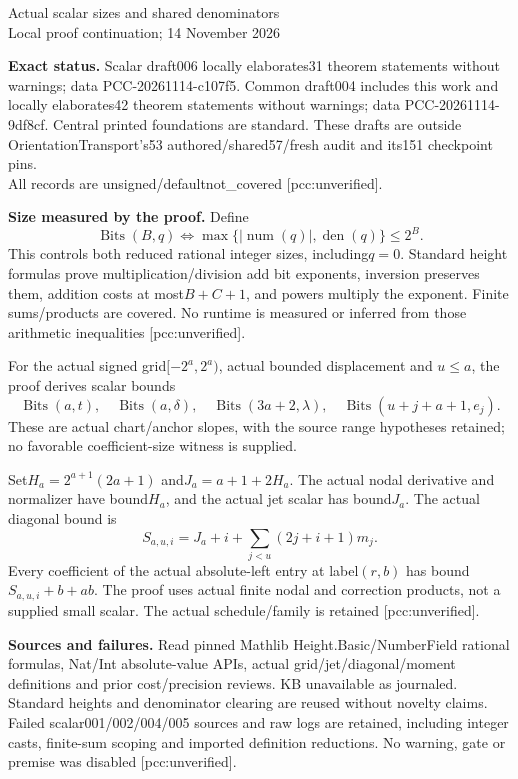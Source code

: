 \documentclass[10pt]{article}
\begin{document}
\begin{center}{\Large Actual scalar sizes and shared denominators}\\[5pt]
Local proof continuation; 14 November 2026
\end{center}
\textbf{Exact status.} Scalar draft006 locally elaborates31 theorem statements
without warnings; data PCC-20261114-c107f5. Common draft004 includes this
work and locally elaborates42 theorem statements without warnings; data
PCC-20261114-9df8cf. Central printed foundations are standard. These drafts
are outside OrientationTransport's53 authored/shared57/fresh audit and its151
checkpoint pins.\\
All records are unsigned/defaultnot\_covered [pcc:unverified].

\textbf{Size measured by the proof.} Define
\[
 \operatorname{Bits}(B,q)\iff
 \max\{|\operatorname{num}(q)|,\operatorname{den}(q)\}\le2^B.
\]
This controls both reduced rational integer sizes, including$q=0$.
Standard height formulas prove multiplication/division add bit exponents,
inversion preserves them, addition costs at most$B+C+1$, and powers multiply
the exponent. Finite sums/products are covered. No runtime is measured or
inferred from those arithmetic inequalities [pcc:unverified].

For the actual signed grid$[-2^a,2^a)$, actual bounded displacement and
$u\le a$, the proof derives scalar bounds
\[
 \operatorname{Bits}(a,t),\quad \operatorname{Bits}(a,\delta),\quad
 \operatorname{Bits}(3a+2,\lambda),\quad
 \operatorname{Bits}(u+j+a+1,e_j).
\]
These are actual chart/anchor slopes, with the source range hypotheses
retained; no favorable coefficient-size witness is supplied.

Set$H_a=2^{a+1}(2a+1)$ and$J_a=a+1+2H_a$. The actual nodal derivative and
normalizer have bound$H_a$, and the actual jet scalar has bound$J_a$.
The actual diagonal bound is
\[
 S_{a,u,i}=J_a+i+\sum_{j<u}(2j+i+1)m_j.
\]
Every coefficient of the actual absolute-left entry at label$(r,b)$ has
bound$S_{a,u,i}+b+ab$. The proof uses actual finite nodal and correction
products, not a supplied small scalar. The actual schedule/family is retained
[pcc:unverified].

\textbf{Sources and failures.} Read pinned Mathlib Height.Basic/NumberField
rational formulas, Nat/Int absolute-value APIs, actual grid/jet/diagonal/moment
definitions and prior cost/precision reviews. KB unavailable as journaled.
Standard heights and denominator clearing are reused without novelty claims.
Failed scalar001/002/004/005 sources and raw logs are retained, including
integer casts, finite-sum scoping and imported definition reductions. No
warning, gate or premise was disabled [pcc:unverified].
\end{document}
